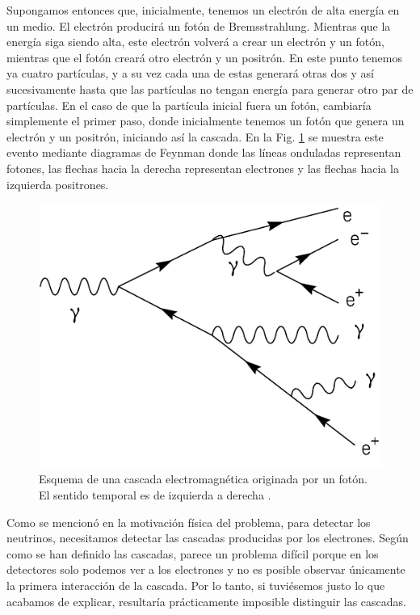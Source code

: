 \documentclass[a4paper,12pt,oneside,titlepage]{book}
\begin{document}
Supongamos entonces que, inicialmente, tenemos un electrón de alta energía en un medio. El electrón producirá un fotón de Bremsstrahlung. Mientras que la energía siga siendo alta, este electrón volverá a crear un electrón y un fotón, mientras que el fotón creará otro electrón y un positrón. En este punto tenemos ya cuatro partículas, y a su vez cada una de estas generará otras dos y así sucesivamente hasta que las partículas no tengan energía para generar otro par de partículas. En el caso de que la partícula inicial fuera un fotón, cambiaría simplemente el primer paso, donde inicialmente tenemos un fotón que genera un electrón y un positrón, iniciando así la cascada. En la Fig. \ref{fig:cascada} se muestra este evento mediante diagramas de Feynman donde las líneas onduladas representan fotones, las flechas hacia la derecha representan electrones y las flechas hacia la izquierda positrones.

\begin{figure}[h!]
  \centering
  \includegraphics[scale=0.85]{Schematic_of_a_particle_shower.pdf}
  \caption{Esquema de una cascada electromagnética originada por un fotón. El sentido temporal es de izquierda a derecha \cite{shower}.}
  \label{fig:cascada}
\end{figure}

Como se mencionó en la motivación física del problema, para detectar los neutrinos, necesitamos detectar las cascadas producidas por los electrones. Según como se han definido las cascadas, parece un problema difícil porque en los detectores solo podemos ver a los electrones y no es posible observar únicamente la primera interacción de la cascada. Por lo tanto, si tuviésemos justo lo que acabamos de explicar, resultaría prácticamente imposible distinguir las cascadas.
\end{document}
